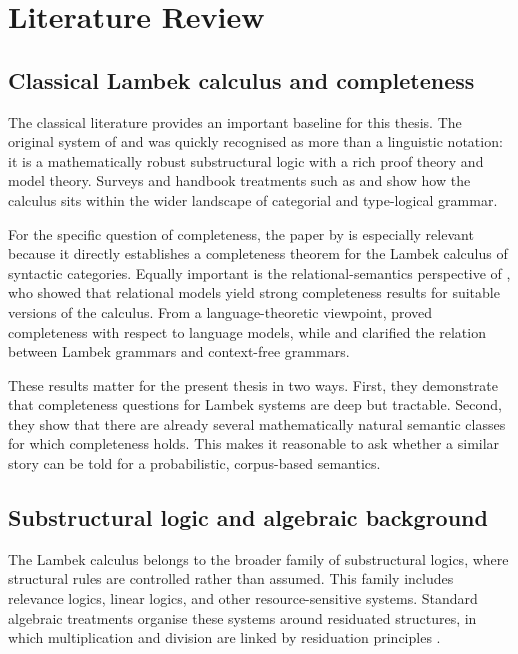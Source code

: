 \chapter{Literature Review}

\section{Classical Lambek calculus and completeness}
The classical literature provides an important baseline for this thesis. The original system of
\citet{Lambek1958} and \citet{Lambek1961} was quickly recognised as more than a linguistic
notation: it is a mathematically robust substructural logic with a rich proof theory and model
theory. Surveys and handbook treatments such as \citet{vanBenthem1988} and
\citet{Moortgat1997} show how the calculus sits within the wider landscape of categorial and
type-logical grammar.

For the specific question of completeness, the paper by \citet{Dosen1985} is especially relevant
because it directly establishes a completeness theorem for the Lambek calculus of syntactic
categories. Equally important is the relational-semantics perspective of
\citet{AndrekaMikulas1994}, who showed that relational models yield strong completeness results
for suitable versions of the calculus. From a language-theoretic viewpoint, \citet{Pentus1995}
proved completeness with respect to language models, while \citet{Pentus1993} and
\citet{Pentus1997} clarified the relation between Lambek grammars and context-free grammars.

These results matter for the present thesis in two ways. First, they demonstrate that
completeness questions for Lambek systems are deep but tractable. Second, they show that
there are already several mathematically natural semantic classes for which completeness holds.
This makes it reasonable to ask whether a similar story can be told for a probabilistic,
corpus-based semantics.


\section{Substructural logic and algebraic background}
The Lambek calculus belongs to the broader family of substructural logics, where structural
rules are controlled rather than assumed. This family includes relevance logics, linear logics, and
other resource-sensitive systems. Standard algebraic treatments organise these systems around
residuated structures, in which multiplication and division are linked by residuation principles
\citep{GalatosJipsenKowalskiOno2007,DosenSchroederHeister1993}.

